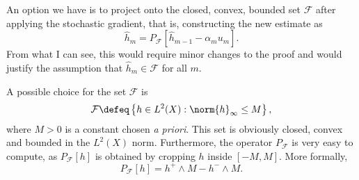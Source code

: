 An option we have is to project onto the closed, convex, bounded set $ \mathcal{F} $ after applying the stochastic gradient, that is, constructing the new estimate as
\begin{equation*}
    \hat{ h }_{ m } = P_{ \mathcal{F} } \left[
        \hat{ h }_{ m-1 } - \alpha_{ m } u_{ m }
    \right]
.\end{equation*}
From what I can see, this would require minor changes to the proof and would justify the assumption that $ \hat{ h }_{ m } \in \mathcal{F} $ for all $ m $.

A possible choice for the set $ \mathcal{F} $ is
\begin{equation*}
    \mathcal{F} \defeq \left\{ h \in L^{ 2 } ( X ) : \norm{ h }_{ \infty } \leq M \right\}
,\end{equation*}
where $ M > 0 $ is a constant chosen \emph{a priori}.
This set is obviously closed, convex and bounded in the $ L^2 ( X ) $ norm.
Furthermore, the operator $ P_{ \mathcal{F} } $ is very easy to compute, as $ P_{ \mathcal{F} } [ h ] $ is obtained by cropping $ h $ inside $ [ -M, M ] $.
More formally,
\begin{equation*}
    P_{ \mathcal{F} } [ h ] = h^{ + } \wedge M - h^{ - } \wedge M
.\end{equation*}
